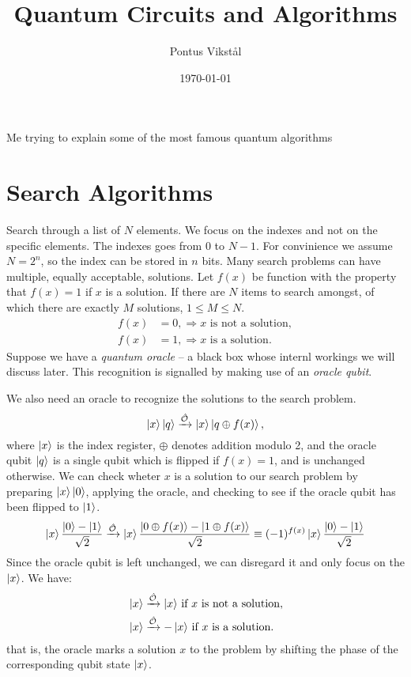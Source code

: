\documentclass[a4paper,draft]{article}
\title{Quantum Circuits and Algorithms}
\author{Pontus Vikstål}
\date{\today}
\begin{document}
\maketitle
Me trying to explain some of the most famous quantum algorithms

\section{Search Algorithms}
Search through a list of $N$ elements. We focus on the indexes and not on the specific elements.
The indexes goes from $0$ to $N-1$. For convinience we assume $N=2^n$, so the index can be stored in $n$ bits. Many search problems can have multiple, equally acceptable, solutions. Let $f(x)$ be function with the property that $f(x)=1$ if $x$ is a solution. If there are $N$ items to search amongst, of which there are exactly $M$ solutions, $1\leq M \leq N$.
\begin{align*}
  f(x)&=0,\Rightarrow\text{$x$ is not a solution},\\
  f(x)&=1,\Rightarrow\text{$x$ is a solution}.
\end{align*}
Suppose we have a \textit{quantum oracle} – a black box whose internl workings we will discuss later. This recognition is signalled by making use of an \textit{oracle qubit}.


We also need an oracle to recognize the solutions to the search problem.
\begin{equation}
  \ket{x}\ket{q}\xrightarrow{\hat{\mathcal{O}}}\ket{x}\ket{q\oplus f(x)},
\end{equation}
where $\ket{x}$ is the index register, $\oplus$ denotes addition modulo 2, and the oracle qubit $\ket{q}$ is a single qubit which is flipped if $f(x)=1$, and is unchanged otherwise. We can check wheter $x$ is a solution to our search problem by preparing $\ket{x}\ket{0}$, applying the oracle, and checking to see if the oracle qubit has been flipped to $\ket{1}$.
\begin{equation}
  \ket{x}\frac{\ket{0}-\ket{1}}{\sqrt{2}}\xrightarrow{\hat{\mathcal{O}}}
  \ket{x}\frac{\ket{0\oplus f(x)}-\ket{1\oplus f(x)}}{\sqrt{2}}
  \equiv (-1)^{f(x)}\ket{x}\frac{\ket{0}-\ket{1}}{\sqrt{2}}
\end{equation}
Since the oracle qubit is left unchanged, we can disregard it and only focus on the $\ket{x}$. We have:
\begin{align*}
  &\ket{x}\xrightarrow{\hat{\mathcal{O}}}\ket{x}\,
  \text{if $x$ is not a solution},\\
  &\ket{x}\xrightarrow{\hat{\mathcal{O}}}-\ket{x}\,
  \text{if $x$ is a solution}.
\end{align*}
that is, the oracle marks a solution $x$ to the problem by shifting the phase of the corresponding qubit state $\ket{x}$.
\end{document}
